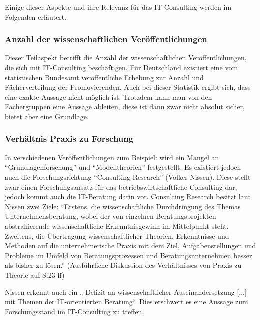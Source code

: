 Einige dieser Aspekte und ihre Relevanz für das IT-Consulting werden im Folgenden erläutert.

\subsubsection*{Anzahl der wissenschaftlichen Veröffentlichungen}
Dieser Teilaspekt betrifft die Anzahl der wissenschaftlichen Veröffentlichungen, die sich mit IT-Consulting beschäftigen. 
Für Deutschland existiert eine vom statistischen Bundesamt veröffentliche Erhebung zur Anzahl und Fächerverteilung der Promovierenden.\cite{destatis}
Auch bei dieser Statistik ergibt sich, dass eine exakte Aussage nicht möglich ist. Trotzdem kann man
von den Fächergruppen eine Aussage ableiten, diese ist dann zwar nicht absolut sicher, bietet aber eine Grundlage.

\subsubsection*{Verhältnis Praxis zu Forschung}
In verschiedenen Veröffentlichungen zum Beispiel: \cite[1]{IDSScheer} wird ein Mangel an ``Grundlagenforschung'' und ``Modelltheorien'' festgestellt. Es existiert jedoch auch die Forschungsrichtung ``Consulting Research'' (Volker Nissen). Diese stellt zwar einen Forschungsansatz für das betriebswirtschaftliche Consulting dar, jedoch kommt auch die IT-Beratung darin vor. Consulting Research besitzt laut Nissen zwei Ziele: ``Erstens, die wissenschaftliche Durchdringung des Themas Unternehmensberatung, wobei der von einzelnen Beratungsprojekten abstrahierende wissenschaftliche Erkenntnisgewinn im Mittelpunkt steht. Zweitens, die Übertragung wissenschaftlicher Theorien, Erkenntnisse und Methoden auf die unternehmerische Praxis mit dem Ziel, Aufgabenstellungen und Probleme im Umfeld von Beratungsprozessen und Beratungsunternehmen besser als bisher zu lösen.''
(Ausführliche Diskussion des Verhältnisses von Praxis zu Theorie auf S.23 ff)

Nissen erkennt auch ein „ Defizit an wissenschaftlicher Auseinandersetzung [...] mit Themen der IT-orientierten Beratung“. Dies erschwert es eine Aussage zum Forschungsstand im IT-Consulting zu treffen.

